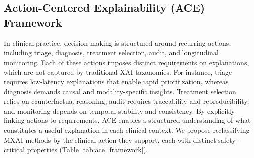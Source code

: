 \documentclass[pdflatex,sn-mathphys-num]{sn-jnl}%
\theoremstyle{thmstyleone}%
\theoremstyle{thmstyletwo}%
\theoremstyle{thmstylethree}%
\begin{document}
\subsection{Action-Centered Explainability (ACE) Framework}
In clinical practice, decision-making is structured around recurring actions, including triage, diagnosis, treatment selection, audit, and longitudinal monitoring.
Each of these actions imposes distinct requirements on explanations, which are not captured by traditional XAI taxonomies.
For instance, triage requires low-latency explanations that enable rapid prioritization, whereas diagnosis demands causal and modality-specific insights. Treatment selection relies on counterfactual reasoning, audit requires traceability and reproducibility, and monitoring depends on temporal stability and consistency. By explicitly linking actions to requirements, ACE enables a structured understanding of what constitutes a useful explanation in each clinical context.
We propose reclassifying MXAI methods by the clinical action they support, each with distinct safety-critical properties (Table \ref{tab:ace_framework}).
\end{document}
